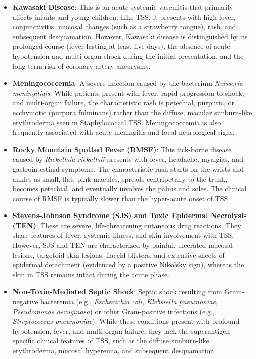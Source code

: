 \begin{itemize}
    \item \textbf{Kawasaki Disease}: This is an acute systemic vasculitis that primarily affects infants and young children. Like TSS, it presents with high fever, conjunctivitis, mucosal changes (such as a strawberry tongue), rash, and subsequent desquamation. However, Kawasaki disease is distinguished by its prolonged course (fever lasting at least five days), the absence of acute hypotension and multi-organ shock during the initial presentation, and the long-term risk of coronary artery aneurysms.
    \item \textbf{Meningococcemia}: A severe infection caused by the bacterium \textit{Neisseria meningitidis}. While patients present with fever, rapid progression to shock, and multi-organ failure, the characteristic rash is petechial, purpuric, or ecchymotic (purpura fulminans) rather than the diffuse, macular sunburn-like erythroderma seen in Staphylococcal TSS. Meningococcemia is also frequently associated with acute meningitis and focal neurological signs.
    \item \textbf{Rocky Mountain Spotted Fever (RMSF)}: This tick-borne disease caused by \textit{Rickettsia rickettsii} presents with fever, headache, myalgias, and gastrointestinal symptoms. The characteristic rash starts on the wrists and ankles as small, flat, pink macules, spreads centripetally to the trunk, becomes petechial, and eventually involves the palms and soles. The clinical course of RMSF is typically slower than the hyper-acute onset of TSS.
    \item \textbf{Stevens-Johnson Syndrome (SJS) and Toxic Epidermal Necrolysis (TEN)}: These are severe, life-threatening cutaneous drug reactions. They share features of fever, systemic illness, and skin involvement with TSS. However, SJS and TEN are characterized by painful, ulcerated mucosal lesions, targetoid skin lesions, flaccid blisters, and extensive sheets of epidermal detachment (evidenced by a positive Nikolsky sign), whereas the skin in TSS remains intact during the acute phase.
    \item \textbf{Non-Toxin-Mediated Septic Shock}: Septic shock resulting from Gram-negative bacteremia (e.g., \textit{Escherichia coli}, \textit{Klebsiella pneumoniae}, \textit{Pseudomonas aeruginosa}) or other Gram-positive infections (e.g., \textit{Streptococcus pneumoniae}). While these conditions present with profound hypotension, fever, and multi-organ failure, they lack the superantigen-specific clinical features of TSS, such as the diffuse sunburn-like erythroderma, mucosal hyperemia, and subsequent desquamation.

\end{itemize}
